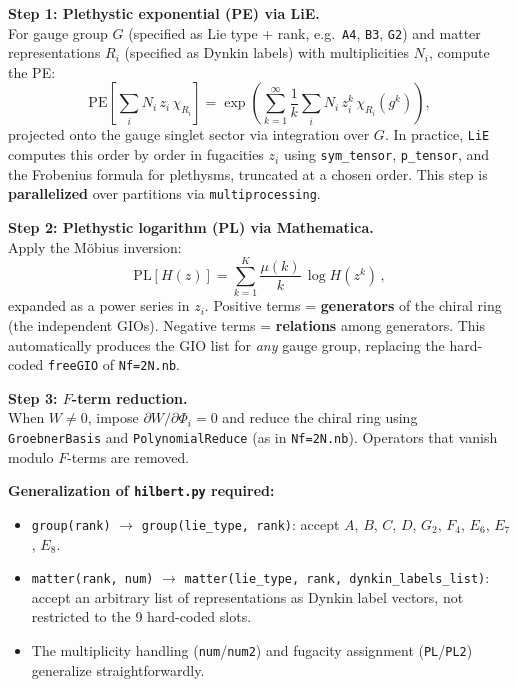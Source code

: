 \documentclass[12pt]{article}
\begin{document}
\begin{enumerate}[label=\textbf{3.\arabic*}]
  \textbf{Step 1: Plethystic exponential (PE) via LiE.} \\
  For gauge group $G$ (specified as Lie type + rank, e.g.\ \texttt{A4}, \texttt{B3}, \texttt{G2}) and
  matter representations $R_i$ (specified as Dynkin labels) with multiplicities $N_i$,
  compute the PE:
  \begin{equation}
    \mathrm{PE}\!\left[\sum_i N_i\, z_i\, \chi_{R_i}\right]
    = \exp\!\left(\sum_{k=1}^{\infty} \frac{1}{k}\sum_i N_i\, z_i^k\, \chi_{R_i}(g^k)\right),
  \end{equation}
  projected onto the gauge singlet sector via integration over $G$.
  In practice, \texttt{LiE} computes this order by order in fugacities $z_i$ using
  \texttt{sym\_tensor}, \texttt{p\_tensor}, and the Frobenius formula for plethysms,
  truncated at a chosen order.
  This step is \textbf{parallelized} over partitions via \texttt{multiprocessing}.

  \textbf{Step 2: Plethystic logarithm (PL) via Mathematica.} \\
  Apply the M\"obius inversion:
  \begin{equation}
    \mathrm{PL}[H(z)] = \sum_{k=1}^{K} \frac{\mu(k)}{k}\,\log H(z^k)\,,
  \end{equation}
  expanded as a power series in $z_i$.
  Positive terms = \textbf{generators} of the chiral ring (the independent GIOs).
  Negative terms = \textbf{relations} among generators.
  This automatically produces the GIO list for \emph{any} gauge group, replacing
  the hard-coded \texttt{freeGIO} of \texttt{Nf=2N.nb}.

  \textbf{Step 3: $F$-term reduction.} \\
  When $W \neq 0$, impose $\partial W / \partial \Phi_i = 0$ and reduce the chiral ring
  using \texttt{GroebnerBasis} and \texttt{PolynomialReduce} (as in \texttt{Nf=2N.nb}).
  Operators that vanish modulo $F$-terms are removed.

  \textbf{Generalization of \texttt{hilbert.py} required:}
  \begin{itemize}
    \item \texttt{group(rank)} $\to$ \texttt{group(lie\_type, rank)}: accept $A$, $B$, $C$, $D$, $G_2$, $F_4$, $E_6$, $E_7$, $E_8$.
    \item \texttt{matter(rank, num)} $\to$ \texttt{matter(lie\_type, rank, dynkin\_labels\_list)}:
      accept an arbitrary list of representations as Dynkin label vectors,
      not restricted to the 9 hard-coded slots.
    \item The multiplicity handling (\texttt{num}/\texttt{num2}) and fugacity assignment
      (\texttt{PL}/\texttt{PL2}) generalize straightforwardly.
  \end{itemize}


\end{enumerate}
\end{document}
